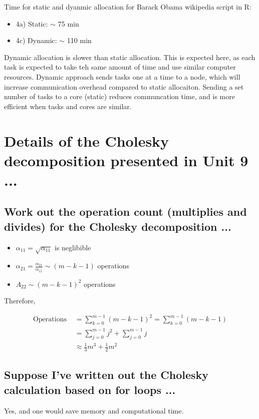 \documentclass{article}\usepackage[]{graphicx}\usepackage[]{color}
\begin{document}
Time for static and dyanmic allocation for Barack Obama wikipedia script in R:

\begin{itemize}
    \item[] 4a) Static: $\sim$ 75 min
    \item[] 4c) Dynamic: $\sim$ 110 min
\end{itemize}

Dynamic allocation is slower than static allocation. This is expected here, as each task is expected to take teh same amount of time and use similar computer resources. Dynamic approach sends tasks one at a time to a node, which will increase communication overhead  compared to static allocaiton. Sending a set number of tasks to a core (static) reduces communcation time, and is more efficient when tasks and cores are similar.


\section{Details of the Cholesky decomposition presented in Unit 9 ...}

\subsection{Work out the operation count (multiplies and divides) for the Cholesky decomposition ...}

\begin{itemize}
    \item $\alpha_{11} = \sqrt{\alpha_{11}}$ is neglibible
    \item $\alpha_{21} = \frac{\alpha_{21}}{\alpha_{11}} \sim (m - k - 1)$ operations
    \item $A_{22} \sim (m-k-1)^2$ operations
\end{itemize}

Therefore, 

$$\begin{aligned}
\text{Operations } &= \sum_{k=0}^{m-1} (m-k-1)^2 = \sum_{k=0}^{m-1} (m - k - 1) \\
&= \sum_{j=0}^{m-1} j^2 + \sum_{j=0}^{m-1} j \\
&\approx \frac{1}{3}m^3 + \frac{1}{2}m^2 
\end{aligned}$$

\subsection{Suppose I’ve written out the Cholesky calculation based on for loops ...}

Yes, and one would save memory and computational time.
\end{document}
